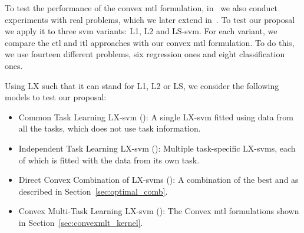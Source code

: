 To test the performance of the convex \acrshort{mtl} formulation, in~\citet{RuizAD19} we also conduct experiments with real problems, which we later extend in~\citet{RuizAD21}. 
To test our proposal we apply it to three \acrshort{svm} variants: L1, L2 and LS-\acrshort{svm}. For each variant, we compare the \acrshort{ctl} and \acrshort{itl} approaches with our convex \acrshort{mtl} formulation. To do this, we use fourteen different problems, six regression ones and eight classification ones.

Using {LX} such that it can stand for {L1}, {L2} or {LS}, we consider the following models to test our proposal:
\begin{itemize}
    \item {Common Task Learning LX-\acrshort{svm} ()}: A single LX-\acrshort{svm} fitted using data from all the tasks, which does not use task information.
    \item {Independent Task Learning LX-\acrshort{svm} ()}: Multiple task-specific LX-\acrshort{svm}s, each of which is fitted with the data from its own task.
    \item {Direct Convex Combination of LX-\acrshort{svm}s ()}: A combination of the best  and  as described in Section~\ref{sec:optimal_comb}.
    \item {Convex Multi-Task Learning LX-\acrshort{svm} ()}: The Convex \acrshort{mtl} formulations shown in Section~\ref{sec:convexmlt_kernel}.
\end{itemize}

